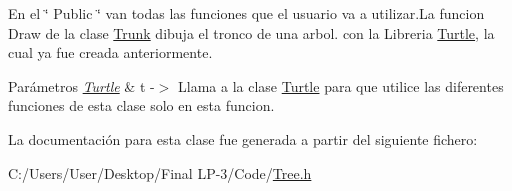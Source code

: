 En el \char`\"{} Public \char`\"{} van todas las funciones que el usuario va a utilizar.\+La funcion Draw de la clase \mbox{\hyperlink{class_trunk}{Trunk}} dibuja el tronco de una arbol. con la Libreria \mbox{\hyperlink{class_turtle}{Turtle}}, la cual ya fue creada anteriormente.
\begin{DoxyParams}{Parámetros}
{\em \mbox{\hyperlink{class_turtle}{Turtle}}} & t -\/$>$ Llama a la clase \mbox{\hyperlink{class_turtle}{Turtle}} para que utilice las diferentes funciones de esta clase solo en esta funcion. \\
\hline
\end{DoxyParams}


La documentación para esta clase fue generada a partir del siguiente fichero\+:\begin{DoxyCompactItemize}
\item 
C\+:/\+Users/\+User/\+Desktop/\+Final L\+P-\/3/\+Code/\mbox{\hyperlink{_tree_8h}{Tree.\+h}}\end{DoxyCompactItemize}
